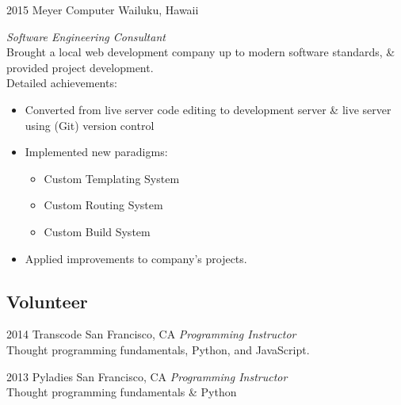 \documentclass[]{friggeri-cv} %
\begin{document}
\begin{entrylist}


\entry
{2015}
{Meyer Computer}
{Wailuku, Hawaii}
{\emph{Software Engineering Consultant} \\
Brought a local web development company up to modern software standards, \& provided project development. \\Detailed achievements:
\begin{itemize}
\item Converted from live server code editing to development server \& live server using (Git) version control
\item Implemented new paradigms:
\begin{itemize}
\item Custom Templating System
\item Custom Routing System
\item Custom Build System
\end{itemize}
\item Applied improvements to company’s projects.
\end{itemize}}


\end{entrylist}

\subsection{Volunteer}

\begin{entrylist}

\entry
{2014}
{Transcode}
{San Francisco, CA}
{\emph{Programming Instructor} \\
Thought programming fundamentals, Python, and JavaScript.}


\entry
{2013}
{Pyladies}
{San Francisco, CA}
{\emph{Programming Instructor} \\
Thought programming fundamentals \& Python}



\end{entrylist}

\end{document}
